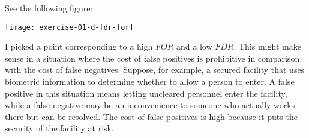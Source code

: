 \documentclass[12pt]{article}
\begin{document}
\begin{enumerate}

See the following figure:

\begin{center}
	\texttt{[image: exercise-01-d-fdr-for]}
\end{center}

I picked a point corresponding to a high $FOR$ and a low $FDR$. This might make sense
in a situation where the cost of false positives is prohibitive in comparison with
the cost of false negatives. Suppose, for example, a secured facility that
uses biometric information to determine whether to allow a person to enter.
A false positive in this situation means letting uncleared personnel enter the
facility, while a false negative may be an inconvenience to someone who actually
works there but can be resolved. The cost of false positives is high because
it puts the security of the facility at risk.

\end{enumerate}



\end{document}
